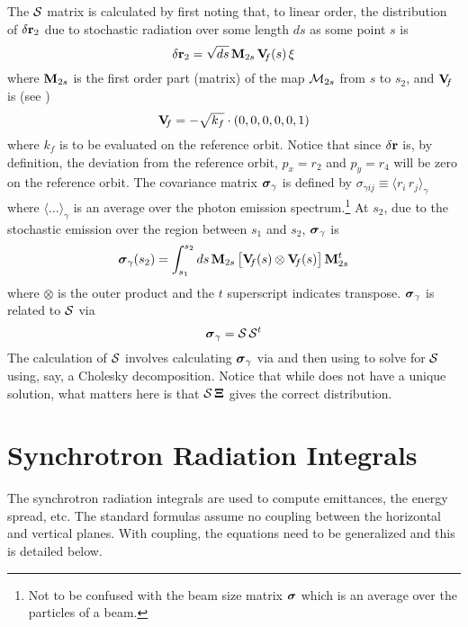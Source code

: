 The ${\cal S}$ matrix is calculated by first noting that, to linear order, the distribution of
$\delta{\bf r}_2$ due to stochastic radiation over some length $ds$ as some point $s$ is
\begin{equation}
  \delta{\bf r}_2 = \sqrt{ds} \, {\bf M}_{2s} \, {\bf V}_{\mkern-6 mu{f}}(s) \, \xi
\end{equation}
where ${\bf M}_{2s}$ is the first order part (matrix) of the map ${\cal M}_{2s}$ from $s$ to $s_2$, and
${\bf V}_{\mkern-6 mu{f}}$ is (see )
\begin{equation}
  {\bf V}_{\mkern-6 mu{f}} = -\sqrt{k_f} \cdot (0, 0, 0, 0, 0, 1)
\end{equation}
where $k_f$ is to be evaluated on the reference orbit. Notice that since $\delta{\bf r}$ is, by definition,
the deviation from the reference orbit, $p_x = r_2$ and $p_y = r_4$ will be zero on the reference
orbit. The covariance matrix $\boldsymbol{\sigma}_\gamma$ is defined by $\sigma_{\gamma ij} \equiv \langle r_i \, r_j
\rangle_\gamma$ where $\langle \ldots \rangle_\gamma$ is an average over the photon emission
spectrum.\footnote
  {
Not to be confused with the beam size matrix $\boldsymbol{\sigma}$ which is an average over the particles of a beam.
  }
 At $s_2$, due to the
stochastic emission over the region between $s_1$ and $s_2$, $\boldsymbol{\sigma}_\gamma$ is
\begin{equation}
  \boldsymbol{\sigma}_\gamma(s_2) = \int_{s_1}^{s_2} ds \, 
  {\bf M}_{2s} \, \big[ {\bf V}_{\mkern-6 mu{f}}(s) \otimes {\bf V}_{\mkern-6 mu{f}}(s) \big] \, {\bf M}_{2s}^t
  \label{smvvm}
\end{equation}
where $\otimes$ is the outer product and the $t$ superscript indicates transpose. $\boldsymbol{\sigma}_\gamma$ is related to
${\cal S}$ via
\begin{equation}
  \boldsymbol{\sigma}_\gamma = {\cal S} \, {\cal S}^t
  \label{sxx}
\end{equation}
The calculation of ${\cal S}$ involves calculating $\boldsymbol{\sigma}_\gamma$ via  and then using 
to solve for ${\cal S}$ using, say, a Cholesky decomposition. Notice that while  does not have a
unique solution, what matters here is that ${\cal S} \, {\bf \Xi}$ gives the correct distribution.

\section{Synchrotron Radiation Integrals}
\label{s:synch.ints}

The synchrotron radiation integrals are used to compute emittances, the energy spread, etc. The
standard formulas assume no coupling between the horizontal and vertical
planes\cite{b:helm,b:jowett}. With coupling, the equations need to be generalized and this is
detailed below.

